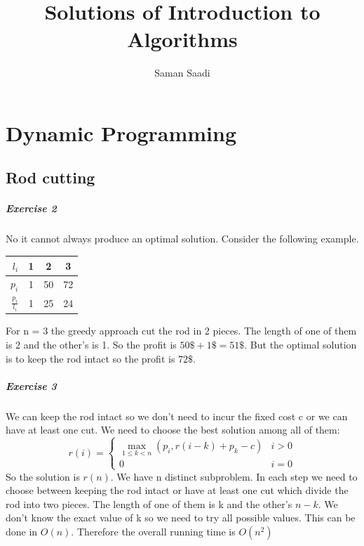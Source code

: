 \documentclass{book}
\title{Solutions of Introduction to Algorithms}
\author{Saman Saadi}
\date{}
\begin{document}
	\frontmatter
	\maketitle
	\tableofcontents
	\mainmatter
	\chapter{Dynamic Programming}
	\section{Rod cutting}	
	\paragraph{Exercise 2}
	No it cannot always produce an optimal solution. Consider the following example.
	\begin{table}[H]
		\centering
		\begin{tabular}{r||c|c|c}			
			$l_i$ & 1 & 2 & 3\\
			\hline
			$p_i$ & 1 & 50 & 72 \\
			\hline
			$\frac{p_i}{l_i}$ & 1 & 25 & 24
		\end{tabular}
	\end{table}
	For n = 3 the greedy approach cut the rod in 2 pieces. The length of one of them is 2 and the other's is 1. So the profit is $50\$ + 1\$ = 51\$$. But the optimal solution is to keep the rod intact so the profit is $72\$$.
	\paragraph{Exercise 3}
	We can keep the rod intact so we don't need to incur the fixed cost c or we can have at least one cut. We need to choose the best solution among all of them:
	\begin{equation*}
	r(i) = \begin{cases}
	\max\limits_{1 \leq k < n}(p_i, r(i - k) + p_k - c) & i > 0 \\
	0 & i = 0
	\end{cases}
	\end{equation*}
	So the solution is $r(n)$. We have n distinct subproblem. In each step we need to choose between keeping the rod intact or have at least one cut which divide the rod into two pieces. The length of one of them is k and the other's $n - k$. We don't know the exact value of k so we need to try all possible values. This can be done in $O(n)$. Therefore the overall running time is $O(n^2)$
	
\end{document}
